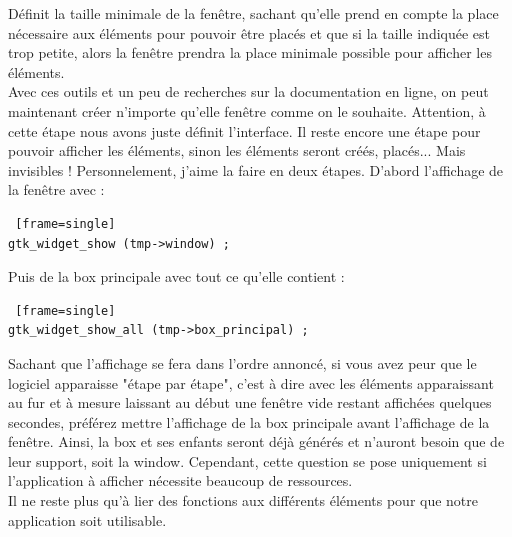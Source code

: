 \documentclass[11pt,french,a4paper]{report}
\begin{document}
Définit la taille minimale de la fenêtre, sachant qu'elle prend en compte la place nécessaire aux éléments pour pouvoir 
être placés et que si la taille indiquée est trop petite, alors la fenêtre prendra la place minimale possible 
pour afficher les éléments. \\
Avec ces outils et un peu de recherches sur la documentation en ligne, on peut maintenant créer n'importe qu'elle fenêtre 
comme on le souhaite. 
Attention, à cette étape nous avons juste définit l'interface. Il reste encore une étape pour pouvoir afficher les éléments, sinon
les éléments seront créés, placés... Mais invisibles ! 
Personnelement, j'aime la faire en deux étapes. D'abord l'affichage de la fenêtre avec : \\
\begin{lstlisting} [frame=single]
gtk_widget_show (tmp->window) ;
\end{lstlisting}
Puis de la box principale avec tout ce qu'elle contient : \\
\begin{lstlisting} [frame=single]
gtk_widget_show_all (tmp->box_principal) ; 
\end{lstlisting}
Sachant que l'affichage se fera dans l'ordre annoncé, si vous avez peur que le logiciel apparaisse "étape par étape", c'est à 
dire avec les éléments apparaissant au fur et à mesure laissant au début une fenêtre vide restant affichées quelques secondes, 
préférez mettre l'affichage de la box principale avant l'affichage de la fenêtre. Ainsi, la box et ses enfants seront déjà générés 
et n'auront besoin que de leur support, soit la window. Cependant, cette question se pose uniquement si l'application 
à afficher nécessite beaucoup de ressources. \\
Il ne reste plus qu'à lier des fonctions aux différents éléments pour que notre application soit utilisable.\\
        
\end{document}
